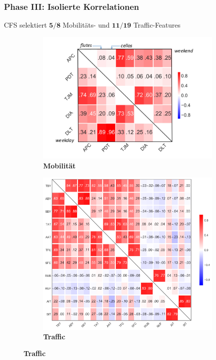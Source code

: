\documentclass{beamer}
\begin{document}
\begin{frame}
  \frametitle{Phase III: Isolierte Korrelationen}
  CFS selektiert $\boldsymbol{5 / 8}$ Mobilitäts- und $\boldsymbol{11 / 19}$ Traffic-Features

  \begin{figure}[H]
    \centering
    \hspace{-3cm}
    \begin{subfigure}[b]{0.45\textwidth}
      \includegraphics[width=1.2\textwidth]{images/mobility_correlations.png}
      \caption*{\textbf{Mobilität}}
    \end{subfigure}
    \hspace{3px}
    \begin{subfigure}[b]{0.45\textwidth}
      \includegraphics[width=1.5\textwidth]{images/traffic_correlations.png}  
      \caption*{\textbf{Traffic}}
    \end{subfigure}    
  \end{figure}  
\end{frame}
\end{document}
